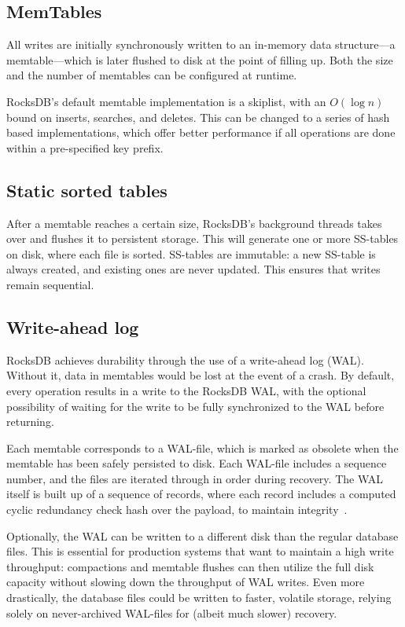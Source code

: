 \subsection{MemTables}
All writes are initially synchronously written to an in-memory data structure---a
memtable---which is later flushed to disk at the point of filling up. Both the
size and the number of memtables can be configured at runtime.

RocksDB's default memtable implementation is a skiplist, with an $ O(\log n) $
bound on inserts, searches, and deletes. This can be changed to a series of hash
based implementations, which offer better performance if all operations are done
within a pre-specified key prefix.

\subsection{Static sorted tables}
After a memtable reaches a certain size, RocksDB's background threads takes over
and flushes it to persistent storage. This will generate one or more SS-tables
on disk, where each file is sorted. SS-tables are immutable: a new SS-table is
always created, and existing ones are never updated. This ensures that writes
remain sequential.

\subsection{Write-ahead log}\label{sec:rocksdb-wal}
RocksDB achieves durability through the use of a write-ahead log (WAL). Without
it, data in memtables would be lost at the event of a crash. By default, every
 operation results in a write to the RocksDB WAL, with the optional
possibility of waiting for the write to be fully synchronized to the WAL before
returning.

Each memtable corresponds to a WAL-file, which is marked as obsolete when the
memtable has been safely persisted to disk. Each WAL-file includes a sequence
number, and the files are iterated through in order during recovery. The WAL
itself is built up of a sequence of records, where each record includes a
computed cyclic redundancy check hash over the payload, to maintain
integrity~\cite{rocksdb-wal}.

Optionally, the WAL can be written to a different disk than the regular database
files. This is essential for production systems that want to maintain a high
write throughput: compactions and memtable flushes can then utilize the full
disk capacity without slowing down the throughput of WAL writes. Even more
drastically, the database files could be written to faster, volatile storage,
relying solely on never-archived WAL-files for (albeit much slower) recovery.

